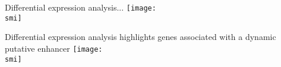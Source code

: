 \documentclass[10pt, usenames, dvipsnames]{beamer}
\def\smi{out/ln/updir/mw-gcthesis-oral/library.bib}
\begin{document}
\begin{frame}{Differential expression analysis...}
  \def\smi{out/ln/updir/mw-gcthesis-oral/ink/atac-clusters/casero-violin-barplot.pdf}
  \texttt{[image: \\smi]}
\end{frame}
\begin{frame}{Differential expression analysis highlights genes associated with a dynamic putative enhancer}
  \def\smi{out/ln/updir/mw-gcthesis-oral/ink/atac-clusters/casero-violin-barplot-top-fc.pdf}
  \texttt{[image: \\smi]}
\end{frame}
\end{document}
